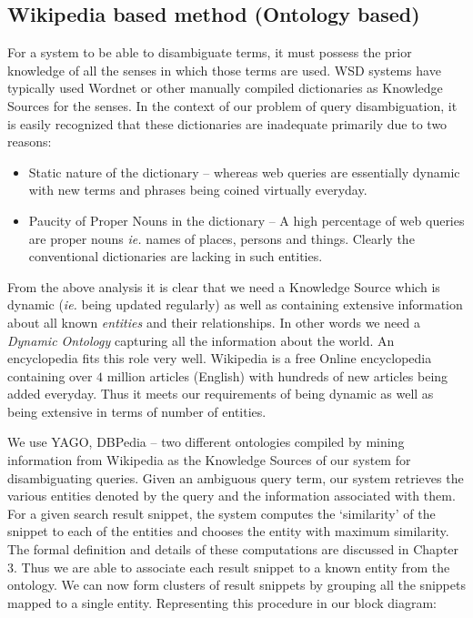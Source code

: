 \documentclass[a4paper,12pt]{report}
\begin{document}
\subsection{Wikipedia based method (Ontology based)}
For a system to be able to disambiguate terms, it must possess the
prior knowledge of all the senses in which those terms are used. WSD
systems have typically used Wordnet or other manually compiled
dictionaries as Knowledge Sources for the senses. In the context of
our problem of query disambiguation, it is easily recognized that
these dictionaries are inadequate primarily due to two reasons:
\begin{itemize}
  \item Static nature of the dictionary -- whereas web queries are
    essentially dynamic with new terms and phrases being coined
    virtually everyday.
  \item Paucity of Proper Nouns in the dictionary -- A high percentage
    of web queries are proper nouns {\it ie.} names of places, persons
    and things. Clearly the conventional dictionaries are lacking in
    such entities.
\end{itemize}

From the above analysis it is clear that we need a Knowledge
Source which is dynamic ({\it ie.} being updated regularly) as well as
containing extensive information about all known {\it entities} and
their relationships. In other words we need a {\it Dynamic Ontology}
capturing all the information about the world. An encyclopedia fits
this role very well. Wikipedia is a free Online encyclopedia
containing over $4$ million articles (English) with hundreds of new
articles being added everyday. Thus it meets our requirements of being
dynamic as well as being extensive in terms of number of entities. 

We use YAGO, DBPedia -- two different ontologies compiled by mining
information from Wikipedia as the Knowledge Sources of our system for
disambiguating queries. Given an ambiguous query term, our system
retrieves the various entities denoted by the query and the
information associated with them. For a given search result snippet,
the system computes the `similarity' of the snippet to each of the
entities and chooses the entity with maximum similarity. The formal
definition and details of these computations are discussed in Chapter
3. Thus we are able to associate each result snippet to a known entity
from the ontology. We can now form clusters of result snippets by
grouping all the snippets mapped to a single entity. Representing this
procedure in our block diagram:
\begin{figure}[h]
  \centering
  \texttt{[image: block\_ont.pdf]}
  \caption{Block diagram of the Ontological clustering method}
\end{figure}
\end{document}
